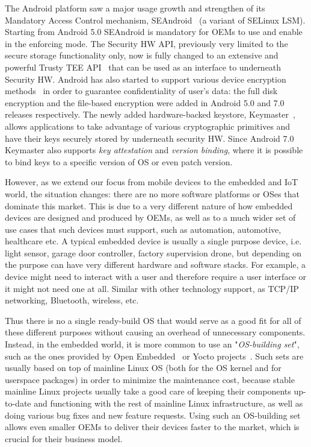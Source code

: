The Android platform saw a major usage growth and strengthen of its Mandatory Access Control mechanism, SEAndroid~\cite{smalley12} (a variant of SELinux LSM). Starting from Android 5.0 SEAndroid is mandatory for OEMs to use and enable in the enforcing mode. The Security HW API, previously very limited to the secure storage functionality only, now is fully changed to an extensive and powerful Trusty TEE API~\cite{trusty} that can be used as an interface to underneath Security HW. Android has also started to support various device encryption methods~\cite{androidencr} in order to guarantee confidentiality of user's data: the full disk encryption and the file-based encryption were added in Android 5.0 and 7.0 releases respectively. The newly added hardware-backed keystore, Keymaster~\cite{androidkeymaster}, allows applications to take advantage of various cryptographic primitives and have their keys securely stored by underneath security HW. Since Android 7.0 Keymaster also supports \textit{key attestation} and \textit{version binding}, where it is possible to bind keys to a specific version of OS or even patch version. 


However, as we extend our focus from mobile devices to the embedded and IoT world, the situation changes: there are no more software platforms or OSes that dominate this market. This is due to a very different nature of how embedded devices are designed and produced by OEMs, as well as to a much wider set of use cases that such devices must support, such as automation, automotive, healthcare etc. A typical embedded device is usually a single purpose device, i.e. light sensor, garage door controller, factory supervision drone, but depending on the purpose can have very different hardware and software stacks. For example, a device might need to interact with a user and therefore require a user interface or it might not need one at all. Similar with other technology support, as TCP/IP networking, Bluetooth, wireless, etc.

Thus there is no a single ready-build OS that would serve as a good fit for all of these different purposes without causing an overhead of unnecessary components. Instead, in the embedded world, it is more common to use an "\textit{OS-building set}", such as the ones provided by Open Embedded~\cite{OE2017} or Yocto projects~\cite{yocto2017}. Such sets are usually based on top of mainline Linux OS (both for the OS kernel and for userspace packages) in order to minimize the maintenance cost, because stable mainline Linux projects usually take a good care of keeping their components up-to-date and functioning with the rest of mainline Linux infrastructure, as well as doing various bug fixes and new feature requests. Using such an OS-building set allows even smaller OEMs to deliver their devices faster to the market, which is crucial for their business model. 

